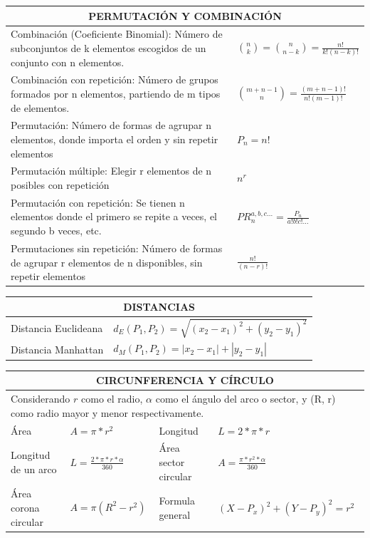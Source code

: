 \documentclass[10pt,landscape,twocolumn,letterpaper,twosided]{article}
\begin{document}
\begin{tabular}{|p{6.5cm}|p{3.9cm}|}
	\hline
	\multicolumn{2}{|c|}{PERMUTACIÓN Y COMBINACIÓN} \\ \hline
	Combinación (Coeficiente Binomial): Número de subconjuntos de k elementos escogidos de un conjunto con n elementos.
		& $ \binom{n}{k} = \binom{n}{n-k} = \displaystyle\frac{n!}{k!(n-k)!} $ \\ \hline

	Combinación con repetición: Número de grupos formados por n elementos, partiendo de m tipos de elementos.
		& $ \binom{m+n-1}{n} = \displaystyle\frac{(m + n - 1)!}{n!(m-1)!} $ \\ \hline
		
	Permutación: Número de formas de agrupar n elementos, donde importa el orden y sin repetir elementos
		& $ P_{n} = n! $ \\ \hline

	Permutación múltiple: Elegir r elementos de n posibles con repetición 
		& $ n^{r} $	\\ \hline
	
	Permutación con repetición: Se tienen n elementos donde el primero se repite a veces, el segundo b veces, etc.
		& $ PR_{n}^{a,b,c...} = \displaystyle\frac{P_{n}}{a!b!c!...}$ \\ \hline
	
	Permutaciones sin repetición: Número de formas de agrupar r elementos de n disponibles, sin repetir elementos
		& $\displaystyle\frac{n!}{(n-r)!}$ \\ \hline
\end{tabular}


\begin{tabular}{|p{2.2cm}|p{8.2cm}|}
	\hline
	\multicolumn{2}{|c|}{DISTANCIAS} \\ \hline
	Distancia Euclideana & $d_{E}(P_{1},P_{2}) = \sqrt{(x_{2}-x_{1})^{2}+(y_{2}-y_{1})^{2}}$ \\ \hline
	Distancia Manhattan & $d_{M}(P_{1}, P_{2}) = |x_{2} - x_{1}| + |y_{2} - y_{1}|$ \\ \hline 
\end{tabular}

\begin{tabular}{|p{2.0cm}|p{2.8cm}|p{2.0cm}|p{2.8cm}|}
	\hline
	\multicolumn{4}{|c|}{CIRCUNFERENCIA Y CÍRCULO} \\  \hline
	\multicolumn{4}{|p{10cm}|}{Considerando $r$ como el radio, $\alpha$ como el ángulo del arco o sector, y (R, r) 
		como radio mayor y menor respectivamente.} \\ \hline
	Área                   & $A = \pi * r^{2} $ & Longitud & $L = 2*\pi*r$  \\ \hline
	Longitud de un arco    & $L = \displaystyle\frac{2*\pi*r*\alpha}{360}$ & Área sector circular 
		& $A = \displaystyle\frac{\pi * r^{2} * \alpha}{360}$ \\ \hline
	Área corona circular   & $A = \pi  (R^{2} - r^{2})$ & Formula general & $(X-P_{x})^{2}+(Y-P_{y})^2=r^{2}$ \\ \hline 
\end{tabular}
\end{document}
